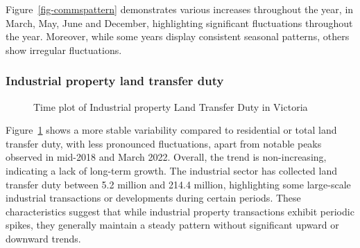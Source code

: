 \documentclass[
  11pt,
  a4paper,
]{article}
\begin{document}
Figure~\ref{fig-commspattern} demonstrates various increases throughout
the year, in March, May, June and December, highlighting significant
fluctuations throughout the year. Moreover, while some years display
consistent seasonal patterns, others show irregular fluctuations.

\subsubsection{Industrial property land transfer
duty}\label{industrial-property-land-transfer-duty}

\begin{figure}


\caption{\label{fig-indtrend}Time plot of Industrial property Land
Transfer Duty in Victoria}

\end{figure}%

Figure~\ref{fig-indtrend} shows a more stable variability compared to
residential or total land transfer duty, with less pronounced
fluctuations, apart from notable peaks observed in mid-2018 and March
2022. Overall, the trend is non-increasing, indicating a lack of
long-term growth. The industrial sector has collected land transfer duty
between 5.2 million and 214.4 million, highlighting some large-scale
industrial transactions or developments during certain periods. These
characteristics suggest that while industrial property transactions
exhibit periodic spikes, they generally maintain a steady pattern
without significant upward or downward trends.
\end{document}
